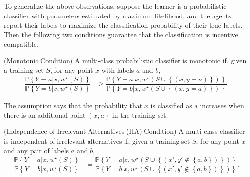 \documentclass{article}
\begin{document}
\begin{figure}[H] \centering {} \label{fig:2dam}
\end{figure}
To generalize the above observations, suppose the learner is a probabilistic classifier with parameters estimated by maximum likelihood, and the agents report their labels to maximize the classification probability of their true labels. Then the following two conditions guarantee that the classification is incentive compatible.
\newline \newline
\begin{df} \label{df:mono} 
(Monotonic Condition) A multi-class probabilistic classifier is monotonic if, given a training set $S $, for any point $x $ with labels $a $ and $b, $
\begin{align*}
\dfrac{\mathbb{P}\left\{Y = a | x, w^\star \left(S\right)\right\}}{\mathbb{P}\left\{Y = b | x, w^\star \left(S\right)\right\}} &\geq  \dfrac{\mathbb{P}\left\{Y = a | x, w^\star \left(S \cup \left\{\left(x, y = a\right)\right\}\right)\right\}}{\mathbb{P}\left\{Y = b | x, w^\star \left(S \cup \left\{\left(x, y = a\right)\right\}\right)\right\}}.
\end{align*}\end{df}
The assumption says that the probability that $x $ is classified as $a $ increases when there is an additional point $\left(x , a \right)$ in the training set.
\newline \newline
\begin{df} \label{df:iia} 
(Independence of Irrelevant Alternatives (IIA) Condition) A multi-class classifier is independent of irrelevant alternatives if, given a training set $S $, for any point $x $ and any pair of labels $a $ and $b, $
\begin{align*}
\dfrac{\mathbb{P}\left\{Y = a | x, w^\star \left(S\right)\right\}}{\mathbb{P}\left\{Y = b | x, w^\star \left(S\right)\right\}} &= \dfrac{\mathbb{P}\left\{Y = a | x, w^\star \left(S \cup \left\{\left(x', y' \notin \left\{a, b\right\}\right)\right\}\right)\right\}}{\mathbb{P}\left\{Y = b | x, w^\star \left(S \cup \left\{\left(x', y' \notin \left\{a, b\right\}\right)\right\}\right)\right\}}.
\end{align*}\end{df}
\end{document}
